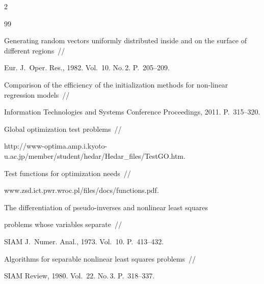 \begin{multicols}{2}
{{\begin{thebibliography}{99}


  Generating random vectors uniformly distributed inside and on the surface of different regions~//

  Eur. J.~Oper. Res., 1982. Vol.~10. No.\,2. P.~205--209.

  



  Comparison of the efficiency of the initialization methods for non-linear regression models~//

  Information Technologies and Systems Conference Proceedings, 2011. P.~315--320.





    Global optimization test problems~//

    {\sf http://www-optima.amp.i.kyoto-u.ac.jp/member/\linebreak student/hedar/Hedar\_files/TestGO.htm}.





    {Test functions for optimization needs}~//

    {\sf www.zsd.ict.pwr.wroc.pl/files/docs/\linebreak functions.pdf}.







  The differentiation of pseudo-inverses and nonlinear least squares

  problems whose variables separate~//

  SIAM J.~Numer. Anal., 1973. Vol.~10. P.~413--432.





  Algorithms for separable nonlinear least squares problems~//

  SIAM Review, 1980. Vol.~22. No.\,3. P.~318--337.




\end{thebibliography}}}
\end{multicols}
